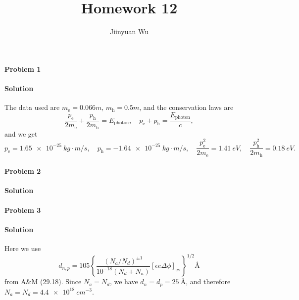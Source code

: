 \documentclass[hyperref, a4paper]{article}
\title{Homework 12}
\author{Jiinyuan Wu}
\begin{document}
    
\maketitle

\paragraph{Problem 1} 

\paragraph{Solution} The data used are $m_{\text{e}} = 0.066m$, 
$m_{\text{h}} = 0.5 m$,
and the conservation laws are 
\begin{equation}
    \frac{p_{\text{e}}}{2m_{\text{e}}} + \frac{p_{\text{h}}}{2m_{\text{h}}} = E_{\text{photon}}, \quad 
    p_{\text{e}} + p_{\text{h}} = \frac{E_{\text{photon}}}{c} ,
\end{equation}
and we get 
\begin{equation}
    p_{\text{e}} = \SI{1.65e-25}{kg \cdot m/s}, \quad 
    p_{\text{h}} = \SI{-1.64e-25}{kg \cdot m/s}, \quad 
    \frac{p_{\text{e}}^2}{2m_{\text{e}}} = \SI{1.41}{eV}, \quad 
    \frac{p_{\text{h}}^2}{2m_{\text{h}}} = \SI{0.18}{eV}.
\end{equation}

\paragraph{Problem 2}

\paragraph{Solution} 

\paragraph{Problem 3}

\paragraph{Solution} Here we use 
\begin{equation}
    d_{n, p}=105\left\{\frac{\left(N_a / N_d\right)^{\pm 1}}{10^{-18}\left(N_d+N_a\right)}[\epsilon e \Delta \phi]_\text{ev}\right\}^{1 / 2} \unit{\angstrom}
\end{equation}
from A\&M (29.18).
Since $N_a = N_d$, we have $d_n = d_p = \SI{25}{\angstrom}$,
and therefore $N_a = N_d = \SI{4.4e18}{cm^{-3}}$.
\end{document}
